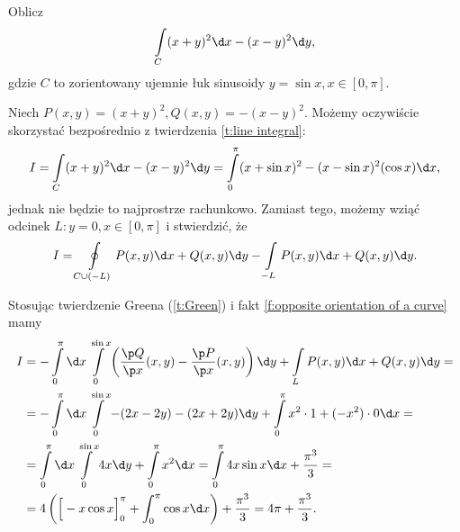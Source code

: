 \begin{example}
    Oblicz
    \[ \int\limits_C (x + y)^2 \d x - (x - y)^2 \d y, \]
    gdzie $C$ to zorientowany ujemnie łuk sinusoidy $y = \sin x, x \in [0, \pi]$.
\end{example}
\begin{solution}
    Niech $P(x, y) = (x + y)^2, Q(x, y) = -(x - y)^2$. Możemy oczywiście skorzystać bezpośrednio z twierdzenia \ref{t:line integral}:
    \[ I = \int\limits_C (x + y)^2 \d x - (x - y)^2 \d y = \int\limits_0^\pi (x + \sin x)^2 - (x - \sin x)^2(\cos x) \d x, \]
    jednak nie będzie to najprostrze rachunkowo. Zamiast tego, możemy wziąć odcinek $L : y = 0, x \in [0, \pi]$ i stwierdzić, że
    \[ I = \oint\limits_{C \cup (-L)} P(x, y) \d x + Q(x, y) \d y - \int\limits_{-L} P(x, y) \d x + Q(x, y) \d y. \]
    \begin{center}
    \end{center}
    Stosując twierdzenie Greena (\ref{t:Green}) i fakt \ref{f:opposite orientation of a curve} mamy
    \begin{align*}
        I &= -\int\limits_0^\pi \d x \int\limits_0^{\sin x} \left(\frac{\p Q}{\p x}(x, y) - \frac{\p P}{\p x}(x, y)\right) \d y + \int\limits_L P(x, y) \d x + Q(x, y) \d y = \\
        &= -\int\limits_0^\pi \d x \int\limits_0^{\sin x} -(2x - 2y) - (2x + 2y) \d y + \int\limits_0^\pi x^2 \cdot 1 + (-x^2) \cdot 0 \d x = \\
        &= \int\limits_0^\pi \d x \int\limits_0^{\sin x} 4x \d y + \int\limits_0^\pi x^2 \d x = \int\limits_0^\pi 4x\sin x \d x + \frac{\pi^3}{3} = \\
        &= 4\left(\Big[-x\cos x\Big]_0^\pi + \int_0^\pi \cos x \d x\right) + \frac{\pi^3}{3} = 4\pi + \frac{\pi^3}{3}.
    \end{align*}
\end{solution}

